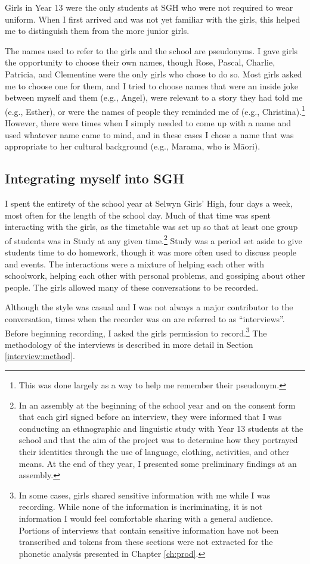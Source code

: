 Girls in Year 13 were the only students at SGH who were not required to wear uniform.  When I first arrived and was not yet familiar with the girls, this helped me to distinguish them from the more junior girls.

The names used to refer to the girls and the school are pseudonyms.  I gave girls the opportunity to choose their own names, though Rose, Pascal, Charlie, Patricia, and Clementine were the only girls who chose to do so.  Most girls asked me to choose one for them, and I tried to choose names that were an inside joke between myself and them (e.g., Angel), were relevant to a story they had told me (e.g., Esther), or were the names of people they reminded me of (e.g., Christina).\footnote{This was done largely as a way to help me remember their pseudonym.}  However, there were times when I simply needed to come up with a name and used whatever name came to mind, and in these cases I chose a name that was appropriate to her cultural background (e.g., Marama, who is M\=aori).




\subsection{Integrating myself into SGH}

I spent the entirety of the school year at Selwyn Girls' High, four days a week, most often for the length of the school day.  Much of that time was spent interacting with the girls, as the timetable was set up so that at least one group of students was in Study at any given time.\footnote{In an assembly at the beginning of the school year and on the consent form that each girl signed before an interview, they were informed that I was conducting an ethnographic and linguistic study with Year 13 students at the school and that the aim of the project was to determine how they portrayed their identities through the use of language, clothing, activities, and other means.  At the end of they year, I presented some preliminary findings at an assembly.}  Study was a period set aside to give students time to do homework, though it was more often used to discuss people and events.  The interactions were a mixture of helping each other with schoolwork, helping each other with personal problems, and gossiping about other people.  The girls allowed many of these conversations to be recorded.

Although the style was casual and I was not always a major contributor to the conversation, times when the recorder was on are referred to as ``interviews''.  Before beginning recording, I asked the girls permission to record.\footnote{In some cases, girls shared sensitive information with me while I was recording.  While none of the information is incriminating, it is not information I would feel comfortable sharing with a general audience.  Portions of interviews that contain sensitive information have not been transcribed and tokens from these sections were not extracted for the phonetic analysis presented in Chapter \ref{ch:prod}.}  The methodology of the interviews is described in more detail in Section \ref{interview:method}.

